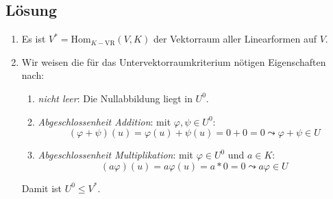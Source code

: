 \subsection{Lösung}
\begin{enumerate}
	\item Es ist \( V^\ast = \text{Hom}_{K-\text{VR}}(V,K) \) der Vektorraum aller Linearformen auf \( V \).
	\item Wir weisen die für das Untervektorraumkriterium nötigen Eigenschaften nach:
	\begin{enumerate}
	 	\item \emph{nicht leer}: Die Nullabbildung liegt in \( U^0 \).
	 	\item \emph{Abgeschlossenheit Addition}: mit \( \varphi, \psi \in U^0 \):
	 	\begin{equation*}
	 	 	(\varphi + \psi)(u) = \varphi(u)+\psi(u) = 0+0 = 0 \leadsto \varphi + \psi \in U
	 	 \end{equation*} 
	 	 \item \emph{Abgeschlossenheit Multiplikation}: mit \( \varphi \in U^0 \) und \( a \in K \): 
	 	 \begin{equation*}
	 	 	(a\varphi)(u) = a\varphi(u) = a*0 = 0 \leadsto a\varphi \in U
	 	 \end{equation*}
	 \end{enumerate} 
	 Damit ist \( U^0 \leq V^\ast \).


\end{enumerate}
